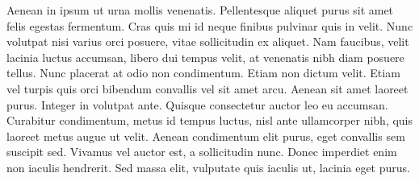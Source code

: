 Aenean in ipsum ut urna mollis venenatis. Pellentesque aliquet purus sit amet felis egestas fermentum. Cras quis mi id neque finibus pulvinar quis in velit. Nunc volutpat nisi varius orci posuere, vitae sollicitudin ex aliquet. Nam faucibus, velit lacinia luctus accumsan, libero dui tempus velit, at venenatis nibh diam posuere tellus. Nunc placerat at odio non condimentum. Etiam non dictum velit. Etiam vel turpis quis orci bibendum convallis vel sit amet arcu. Aenean sit amet laoreet purus. Integer in volutpat ante. Quisque consectetur auctor leo eu accumsan. Curabitur condimentum, metus id tempus luctus, nisl ante ullamcorper nibh, quis laoreet metus augue ut velit. Aenean condimentum elit purus, eget convallis sem suscipit sed. Vivamus vel auctor est, a sollicitudin nunc. Donec imperdiet enim non iaculis hendrerit. Sed massa elit, vulputate quis iaculis ut, lacinia eget purus. 

